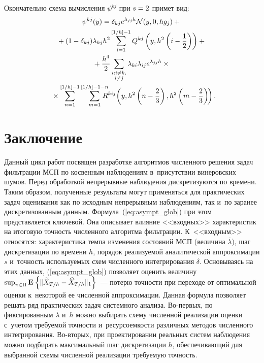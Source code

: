 \begin{multicols}{2}
 Окончательно схема вычисления $\psi^{kj}$ при $s\hm=2$ примет вид:
 \begin{multline*} %
 \psi^{kj}(y)=\delta_{kj}e^{\lambda_{jj}h}\mathcal{N}(y,0,hg_j)
+{}\\
{}+
 (1-\delta_{kj})\lambda_{kj}h^2\sum_{i=1}^{\left[{1}/{h}\right]-1}
Q^{kj}\left(y,h^2\left(i-\fr{1}{2}\right)\right)+ {}\\
{} +
 \fr{h^4}{2}\sum\limits_{\substack{{i:i \neq k,}\\ {i \neq j}}} 
\lambda_{k i}\lambda_{i j} e^{\lambda_{jj}h}\times{}\\
{}\times
\sum\limits_{n=1}^{\left[{1}/{h}\right]-1}
\sum\limits_{m=1}^{\left[{1}/{h}\right]-1-n} \hspace*{-10pt}R^{kij}\!\left(y,h^2
\left(n-\fr{2}{3}\right),h^2\left(m-\fr{2}{3}\right)\!\right).\hspace*{-5.93419pt}
 \end{multline*}

 \section{Заключение}

 Данный цикл работ посвящен разработке алгоритмов численного решения 
задач фильтрации МСП по косвенным наблюдениям в~присутствии винеровских 
шумов. Перед обработкой непрерывные наблюдения дискретизуются по времени. 
Таким образом, полученные результаты могут применяться для практических 
задач оценивания как по исходным непрерывным наблюдениям, так и~по 
заранее дискретизованным данным. Формула~(\ref{eq:asympt_glob}) при этом 
представляется ключевой. Она описывает влияние <<входных>> характеристик 
на итоговую точность численного алгоритма фильтрации. К~<<входным>> 
относятся: характеристика темпа изменения состояний МСП (величина 
$\overline{\lambda}$), шаг дискретизации по времени $h$, порядок 
реализуемой аналитической аппроксимации $s$ и~точность используемых схем 
численного интегрирования $\delta$. Основываясь на этих данных, 
(\ref{eq:asympt_glob}) позволяет оценить величину $\sup\nolimits_{\pi \in 
\Pi}\me{}{\|\widetilde{X}_{T/h} \hm- \widehat{X}_{T/h}\|_1}$~--- потерю 
точности при переходе от оптимальной оценки к~некоторой ее численной 
аппроксимации. Данная формула позволяет решать ряд практических задач 
системного анализа. Во-пер\-вых, по фиксированным $\overline{\lambda}$ 
и~$h$ можно выбирать схему численной реализации оценки с~учетом требуемой 
точности и~ресурсоемкости различных методов численного интегрирования. 
Во-вторых, при проектировании реальных сис\-тем наблюдения можно подбирать 
максимальный шаг дискретизации $h$, обеспечивающий для выбранной схемы 
численной реализации тре\-бу\-емую точность.


\end{multicols}
